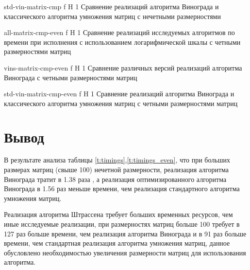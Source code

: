 {std-vin-matrix-cmp} %
{f} %
{H} %
{1\textwidth} %
{Сравнение реализаций алгоритма Винограда и классического алгоритма умножения матриц с нечетными размерностями} %


{all-matrix-cmp-even} %
{f} %
{H} %
{1\textwidth} %
{Сравнение реализаций исследуемых алгоритмов по времени при исполнения с использованием логарифмической шкалы с четными размерностями матриц} %

{vins-matrix-cmp-even} %
{f} %
{H} %
{1\textwidth} %
{Сравнение различных версий реализаций алгоритма Винограда с четными размерностями матриц} %

{std-vin-matrix-cmp-even} %
{f} %
{H} %
{1\textwidth} %
{Сравнение реализаций алгоритма Винограда и классического алгоритма умножения матриц с четными размерностями матриц} %







\section*{Вывод}
В результате анализа таблицы \ref{t:timings},\ref{t:timings_even}, что при больших размерах матриц (свыше 100) нечетной размерности, реализация алгоритма Винограда тратит в  1.38 раза , а реализация  оптимизированного алгоритма Винограда  в 1.56 раз меньше времени, чем реализация стандартного алгоритма умножения матриц.


Реализация алгоритма Штрассена требует больших временных ресурсов, чем иные исследуемые реализации, при размерностях матриц больше 100 требует в 127 раз больше времени, чем реализация алгоритма Винограда и в 91 раз больше времени, чем стандартная реализация алгоритма умножения матриц, данное обусловлено необходимостью увеличения размерности матриц для использования алгоритма.

